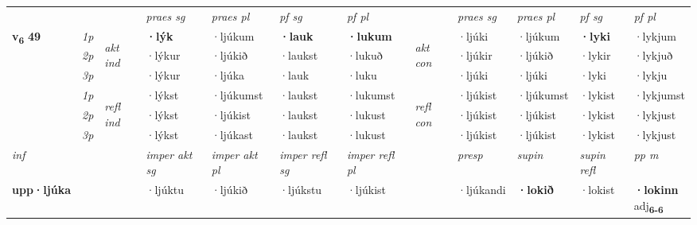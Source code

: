 \begin{longtable}[l]{X>{\footnotesize\itshape}llXXXXlXXXX}
\midrule

 & &   & \textit{praes sg}  & \textit{praes pl}    & \textit{ pf sg} & \textit{pf pl} & & \textit{praes sg}  & \textit{praes pl}    & \textit{pf sg} & \textit{pf pl }  \\ \cmidrule{4-7} \cmidrule{9-12}
 \multirow{2}{*}{{{\textbf{v{\textsubscript{6}}} \Large{\textbf{49}}}}}  & 1p & \multirow{3}{*}{\begin{turn}{90}\textit{akt ind}\end{turn}} & \textbf{·lýk} & ·ljúkum & \textbf{·lauk} & \textbf{·lukum} & \multirow{3}{*}{\begin{turn}{90}\textit{akt con}\end{turn}} &·ljúki & ·ljúkum & \textbf{·lyki} & ·lykjum\\*
 & 2p &  &  ·lýkur  & ·ljúkið & ·laukst & ·lukuð & & ·ljúkir & ·ljúkið & ·lykir & ·lykjuð \\*
 & 3p &  & ·lýkur & ·ljúka & ·lauk & ·luku & & ·ljúki & ·ljúki& ·lyki & ·lykju \\*
\cmidrule{4-7} \cmidrule{9-12}
 & 1p & \multirow{3}{*}{\begin{turn}{90}\textit{refl ind}\end{turn}}  & ·lýkst & ·ljúkumst & ·laukst & ·lukumst & \multirow{3}{*}{\begin{turn}{90}\textit{refl con}\end{turn}}  &·ljúkist & ·ljúkumst & ·lykist & ·lykjumst \\*
 & 2p &  & ·lýkst & ·ljúkist & ·laukst & ·lukust & &·ljúkist & ·ljúkist & ·lykist & ·lykjust \\*
 & 3p  & & ·lýkst & ·ljúkast & ·laukst & ·lukust & & ·ljúkist & ·ljúkist& ·lykist & ·lykjust \\*
\cmidrule{4-7} \cmidrule{9-12}

   {\textit{inf}} & &  & \textit{imper akt sg} & \textit{imper akt pl} & \textit{imper refl sg} & \textit{imper refl pl} && \textit{presp} & \textit{supin} & \textit{supin refl} & \textit{pp m} \\*
  {\textbf{upp\allowbreak ·ljúka}} & && ·ljúktu  & ·ljúkið & ·ljúkstu & ·ljúkist && ·ljúkandi &  \textbf{·lokið} & ·lokist & \specialcell{\textbf{·lokinn} \\ adj\textbf{\textsubscript{6-6}}} \\*

\midrule


\end{longtable}

